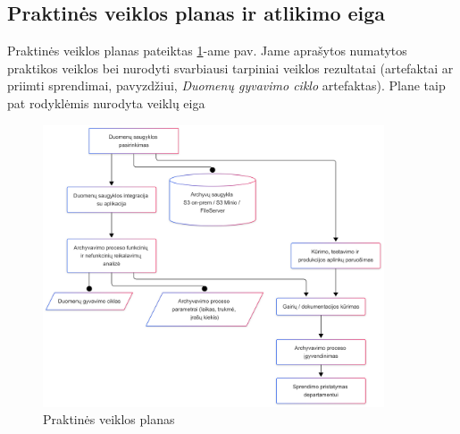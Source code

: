 \subsection*{Praktinės veiklos planas ir atlikimo eiga}

Praktinės veiklos planas pateiktas \ref{fig:plan}-ame pav. Jame aprašytos numatytos praktikos veiklos bei nurodyti svarbiausi tarpiniai veiklos rezultatai (artefaktai ar priimti sprendimai, pavyzdžiui, \textit{Duomenų gyvavimo ciklo} artefaktas). Plane taip pat rodyklėmis nurodyta veiklų eiga 

\begin{figure}
    \centering
    \includegraphics[width=0.9\textwidth]{images/plan.png}
    \caption{Praktinės veiklos planas}
    \label{fig:plan}
\end{figure}
